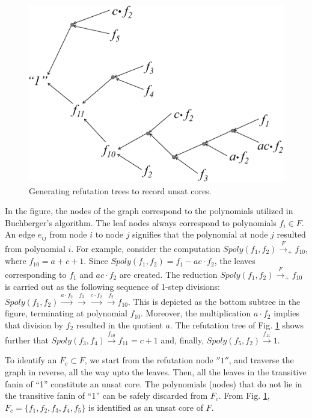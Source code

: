 \begin{figure}[hbt]
\centering
\includegraphics[scale=0.25]{./SAT2016_xiaojun/refutation_tree.eps}
\caption{Generating refutation trees to record unsat cores.}
\label{fig:refute}
\end{figure}

In the figure, the nodes of the graph correspond to the polynomials
utilized in Buchberger's algorithm. The leaf nodes always correspond
to polynomials $f_i \in F$. An edge $e_{ij}$ from node $i$ to node $j$
signifies that the polynomial at node $j$ resulted from polynomial
$i$. For example, consider the computation
$Spoly(f_1,f_2)\xrightarrow{F}_+ f_{10}$, where $f_{10} = a + c +
1$. Since $Spoly(f_1, f_2) = f_1 - ac\cdot f_2$, the leaves
corresponding to $f_1$ and $ac\cdot f_2$ are created. The reduction
$Spoly(f_1,f_2)\xrightarrow{F}_+ f_{10}$ is carried out as the
following sequence of 1-step divisions:
$Spoly(f_1,f_2)\xrightarrow{a\cdot f_2} \xrightarrow{f_3}
\xrightarrow{c\cdot f_2}  \xrightarrow{f_2} f_{10}$. This is depicted
as the bottom subtree in the figure, terminating at polynomial
$f_{10}$. Moreover, the multiplication $a\cdot f_2$ implies that
division by $f_2$ resulted in the quotient $a$. The refutation tree of
Fig. \ref{fig:refute} shows further that
$Spoly(f_3,f_4)\xrightarrow{f_{10}} f_{11} = c+1$ and, finally,
$Spoly(f_5,f_2)\xrightarrow{f_{11}} 1$. 
 
To identify an $F_c \subset F$, we start from the refutation node
$''1''$, and traverse the graph in reverse, all the way upto the
leaves. Then, all the leaves in the transitive fanin of ``1''
constitute an unsat core. The polynomials (nodes) that do not lie in
the transitive fanin of ``1'' can be safely discarded from $F_c$. From
Fig. \ref{fig:refute}, $F_c = \{f_1,f_2,f_3,f_4,f_5\}$ is identified
as an unsat core of $F$. 

